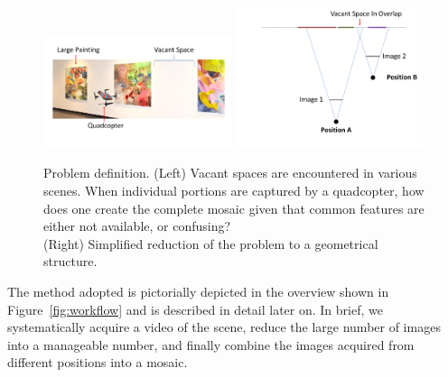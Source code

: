 \documentclass[11pt]{article}
\begin{document}
\begin{figure}[h!]
  \centering
  \includegraphics[width=0.49\textwidth]{mosaicing/figures/indoor}
  \includegraphics[width=0.49\textwidth]{mosaicing/figures/stereoOverlap}

  \caption{ \label{fig:schematic} Problem definition. (Left) Vacant spaces
    are encountered in various scenes.  When individual portions are
    captured by a quadcopter, how does one create the complete mosaic
    given that common features are either not available, or
    confusing?\\
    (Right) Simplified reduction of the problem to a geometrical structure.
  }
\end{figure}    

The method adopted is pictorially depicted in the overview shown in
Figure~\ref{fig:workflow} and is described in detail later on.  In
brief, we systematically acquire a video of the scene, reduce the large
number of images into a manageable number, and finally combine the
images acquired from different positions into a mosaic.
\end{document}
